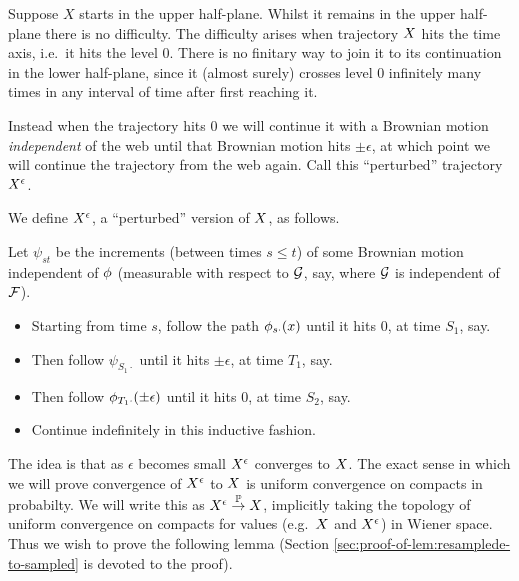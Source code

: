 {Suppose $X$ starts in the upper half-plane.  Whilst it remains in the upper
half-plane there is no difficulty.
The difficulty arises when trajectory $X$
hits the time axis, i.e.\ it hits the level $0$.
There is no finitary way to join
it to its continuation in the lower half-plane, since it (almost
surely) crosses level $0$ infinitely many times in any interval of
time after first reaching it.

Instead when the trajectory hits $0$ we will continue it with a
Brownian motion \emph{independent} of the web until that Brownian
motion hits $\pm\epsilon$, at which point we will continue the
trajectory from the web again.  Call this ``perturbed'' trajectory
$X^{\epsilon}$.

{
\newcommand{\joinernoargs}{\psi}
\newcommand{\joiner}[2]{\joinernoargs_{{#1}{#2}}}
\begin{definition}
  \label{def:resamplede}
  We define $X^{\epsilon}$, a ``perturbed'' version of $X$, as
  follows.

  Let $\joiner{s}{t}$ be the increments (between times $s \le t$) of
  some Brownian motion independent of $\phi$ (measurable with
  respect to $\mathcal{G}$, say, where $\mathcal{G}$ is independent of
  $\mathcal{F}$).

  \begin{itemize}
  \item Starting from time $s$, follow the path $\phi_{{s}{\cdot}}(x)$
    until it hits $0$, at time $S_1$, say.
  \item Then follow $\joiner{S_1}{\cdot}$ until it hits $\pm \epsilon$, at
    time $T_1$, say.
  \item Then follow $\phi_{{T_1}{\cdot}}(\pm \epsilon)$ until it hits $0$, at
    time $S_2$, say.
  \item Continue indefinitely in this inductive fashion.
  \end{itemize}
\end{definition}
}

The idea is that as $\epsilon$ becomes small $X^{\epsilon}$
converges to $X$.
The exact sense in which we will prove convergence of $X^{\epsilon}$ to
$X$ is uniform convergence on compacts in probabilty.  We will
write this as $X^{\epsilon} \overset{\mathbb{P}}\to X$, implicitly taking the
topology of uniform convergence on compacts for values (e.g.\ $X$
and $X^{\epsilon}$) in Wiener space.  Thus we wish to prove the following
lemma (Section \ref{sec:proof-of-lem:resamplede-to-sampled} is devoted
to the proof).

}
